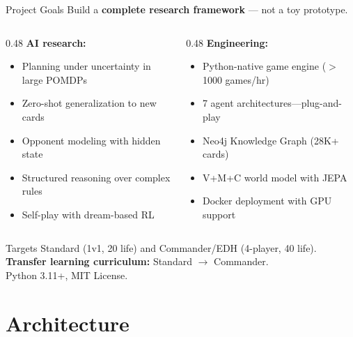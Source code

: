 \documentclass[aspectratio=169, 10pt]{beamer}
\begin{document}
\begin{frame}{Project Goals}
  Build a \textbf{complete research framework} --- not a toy prototype.
  \vspace{0.3cm}
  \begin{columns}[T]
    \begin{column}{0.48\textwidth}
      \textbf{AI research:}
      \begin{itemize}\small
        \item Planning under uncertainty in large POMDPs
        \item Zero-shot generalization to new cards
        \item Opponent modeling with hidden state
        \item Structured reasoning over complex rules
        \item Self-play with dream-based RL
      \end{itemize}
    \end{column}
    \begin{column}{0.48\textwidth}
      \textbf{Engineering:}
      \begin{itemize}\small
        \item Python-native game engine ($>$1000 games/hr)
        \item 7 agent architectures---plug-and-play
        \item Neo4j Knowledge Graph (28K+ cards)
        \item V+M+C world model with JEPA
        \item Docker deployment with GPU support
      \end{itemize}
    \end{column}
  \end{columns}
  \vspace{0.4cm}
  \begin{center}
    \footnotesize
    Targets Standard (1v1, 20 life) and Commander/EDH (4-player, 40 life).\\
    \textbf{Transfer learning curriculum:} Standard $\to$ Commander.\\
    Python 3.11+, MIT License.
  \end{center}
\end{frame}


\section{Architecture}
\end{document}
